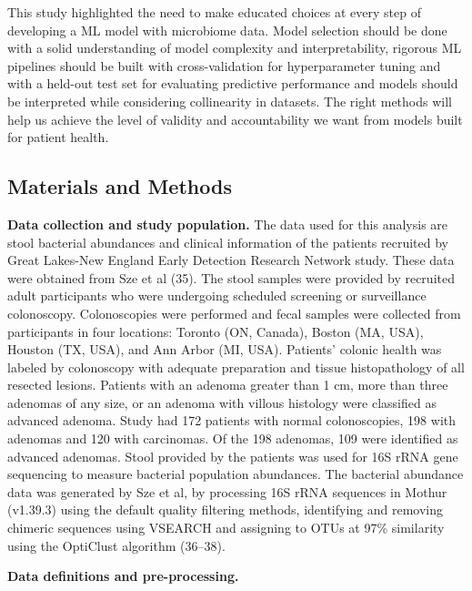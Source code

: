 \documentclass[11pt,]{article}
\begin{document}
This study highlighted the need to make educated choices at every step
of developing a ML model with microbiome data. Model selection should be
done with a solid understanding of model complexity and
interpretability, rigorous ML pipelines should be built with
cross-validation for hyperparameter tuning and with a held-out test set
for evaluating predictive performance and models should be interpreted
while considering collinearity in datasets. The right methods will help
us achieve the level of validity and accountability we want from models
built for patient health.

\subsection{Materials and Methods}\label{materials-and-methods}

\textbf{Data collection and study population.} The data used for this
analysis are stool bacterial abundances and clinical information of the
patients recruited by Great Lakes-New England Early Detection Research
Network study. These data were obtained from Sze et al (35). The stool
samples were provided by recruited adult participants who were
undergoing scheduled screening or surveillance colonoscopy.
Colonoscopies were performed and fecal samples were collected from
participants in four locations: Toronto (ON, Canada), Boston (MA, USA),
Houston (TX, USA), and Ann Arbor (MI, USA). Patients' colonic health was
labeled by colonoscopy with adequate preparation and tissue
histopathology of all resected lesions. Patients with an adenoma greater
than 1 cm, more than three adenomas of any size, or an adenoma with
villous histology were classified as advanced adenoma. Study had 172
patients with normal colonoscopies, 198 with adenomas and 120 with
carcinomas. Of the 198 adenomas, 109 were identified as advanced
adenomas. Stool provided by the patients was used for 16S rRNA gene
sequencing to measure bacterial population abundances. The bacterial
abundance data was generated by Sze et al, by processing 16S rRNA
sequences in Mothur (v1.39.3) using the default quality filtering
methods, identifying and removing chimeric sequences using VSEARCH and
assigning to OTUs at 97\% similarity using the OptiClust algorithm
(36--38).

\textbf{Data definitions and pre-processing.}
\end{document}
